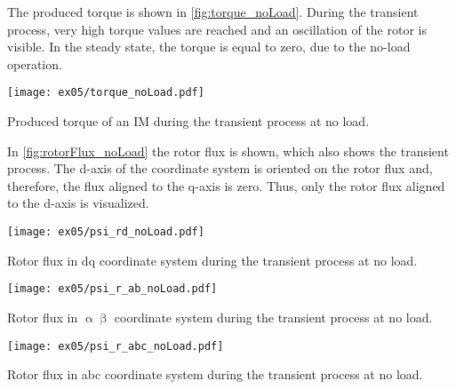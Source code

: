 \begin{solutionblock}
    The produced torque is shown in \autoref{fig:torque_noLoad}. During the transient process, very high torque values are reached and an oscillation of the rotor is visible. In the steady state, the torque is equal to zero, due to the no-load operation.
    \begin{solutionfigure}[ht]
        \centering
        \texttt{[image: ex05/torque\_noLoad.pdf]}
        \caption{Produced torque of an IM during the transient process at no load.}
        \label{fig:torque_noLoad}
    \end{solutionfigure}

    In \autoref{fig:rotorFlux_noLoad} the rotor flux is shown, which also shows the transient process. The d-axis of the coordinate system is oriented on the rotor flux and, therefore, the flux aligned to the q-axis is zero. Thus, only the rotor flux aligned to the d-axis is visualized.
    \begin{solutionfigure}[ht]
        \centering
        \texttt{[image: ex05/psi\_rd\_noLoad.pdf]}
        \caption{Rotor flux in dq coordinate system during the transient process at no load.}
        \label{fig:rotorFlux_noLoad}
    \end{solutionfigure}

    \begin{solutionfigure}[ht]
        \centering
        \texttt{[image: ex05/psi\_r\_ab\_noLoad.pdf]}
        \caption{Rotor flux in $\upalpha\upbeta$ coordinate system during the transient process at no load.}
        \label{fig:rotorFlux_r_ab_noLoad}
    \end{solutionfigure}

    \begin{solutionfigure}[ht]
        \centering
        \texttt{[image: ex05/psi\_r\_abc\_noLoad.pdf]}
        \caption{Rotor flux in abc coordinate system during the transient process at no load.}
        \label{fig:rotorFlux_r_abc_noLoad}
    \end{solutionfigure}

\end{solutionblock}


\FloatBarrier


